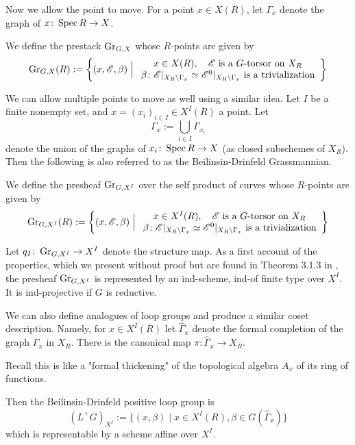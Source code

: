 \documentclass[12pt]{article}
\begin{document}
Now we allow the point to move. For a point $x \in X(R)$, let $\Gamma_x $ denote the graph of $x \colon \operatorname{Spec} R \to X$. 
\begin{defn}
    We define the prestack $\operatorname{Gr}_{G,X}$ whose $R$-points are given by
    \[\operatorname{Gr}_{G,X}(R) := \left\{(x, \mathscr{E}, \beta) \;\Big\vert\; \begin{array}{c}
        x \in X(R), \quad\mathscr{E} \text{ is a } G\text{-torsor on } X_R \\
        \beta \colon \mathscr{E}\vert_{X_R\setminus \Gamma_x} \simeq \mathscr{E}^0\vert_{X_R\setminus \Gamma_x} \text{ is a trivialization} 
    \end{array}\right\}\]
\end{defn}
We can allow multiple points to move as well using a similar idea. Let $I$ be a finite nonempty set, and $x = (x_i)_{i \in I} \in X^I(R)$ a point. Let
\[\Gamma_x := \bigcup_{i \in I} \Gamma_{x_i}\]
denote the union of the graphs of $x_i \colon \operatorname{Spec} R \to X$ (as closed subschemes of $X_R$). Then the following is also referred to as the Beilinsin-Drinfeld Grassmannian.

\begin{defn}
    We define the presheaf $\operatorname{Gr}_{G, X^I}$ over the self product of curves whose $R$-points are given by
    \[\operatorname{Gr}_{G, X^I}(R) := \left\{(x, \mathscr{E}, \beta) \;\Big\vert\; \begin{array}{c}
        x \in X^I(R), \quad\mathscr{E} \text{ is a } G\text{-torsor on } X_R \\
        \beta \colon \mathscr{E}\vert_{X_R\setminus \Gamma_x} \simeq \mathscr{E}^0\vert_{X_R\setminus \Gamma_x} \text{ is a trivialization} 
    \end{array}\right\}\]
\end{defn}
Let $q_I \colon \operatorname{Gr}_{G,X^I} \to X^I$ denote the structure map. As a first account of the properties, which we present without proof but are found in Theorem 3.1.3 in \cite{Zhu2016}, the presheaf $\operatorname{Gr}_{G,X^I}$ is represented by an ind-scheme, ind-of finite type over $X^I$. It is ind-projective if $G$ is reductive.

We can also define analogues of loop groups and produce a similar coset description. Namely, for $x \in X^I(R)$ let $\hat{\Gamma}_x$ denote the formal completion of the graph $\Gamma_x$ in $X_R$. There is the canonical map $\pi \colon \hat{\Gamma}_x \to X_R$.

Recall this is like a "formal thickening" of the topological algebra $A_x$ of its ring of functions. 

Then the Beilinsin-Drinfeld positive loop group is
\[(L^+G)_{X^I} := \{(x,\beta) \mid x \in X^I(R), \beta \in G(\hat{\Gamma}_x)\}\]
which is representable by a scheme affine over $X^I$.
\end{document}
